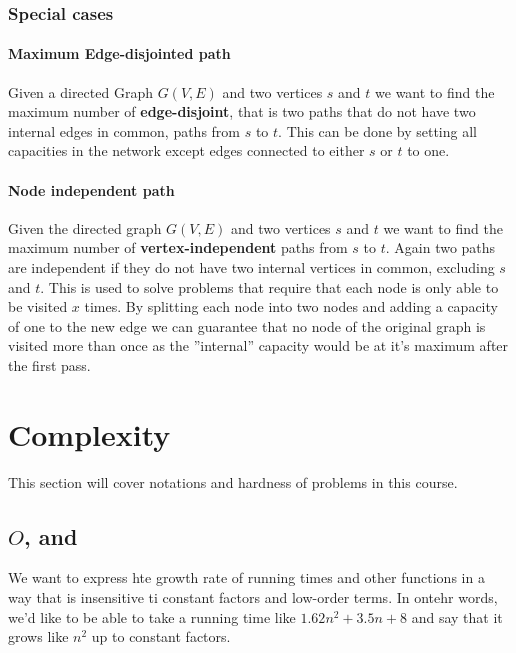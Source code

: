 \documentclass[12pt]{article} %
\begin{document}
\subsubsection{Special cases}

\paragraph{Maximum Edge-disjointed path}
Given a directed Graph $G(V, E)$ and two vertices $s$ and $t$ we want to find the maximum number of \textbf{edge-disjoint}, that is two paths that do not have two internal edges in common, paths from $s$ to $t$. This can be done by setting all capacities in the network except edges connected to either $s$ or $t$ to one.

\paragraph{Node independent path}
Given the directed graph $G(V, E)$ and two vertices $s$ and $t$ we want to find the maximum number of \textbf{vertex-independent} paths from $s$ to $t$. Again two paths are independent if they do not have two internal vertices in common, excluding $s$ and $t$. This is used to solve problems that require that each node is only able to be visited $x$ times. By splitting each node into two nodes and adding a capacity of one to the new edge we can guarantee that no node of the original graph is visited more than once as the ''internal'' capacity would be at it's maximum after the first pass.

\section{Complexity}
This section will cover notations and hardness of problems in this course.

\subsection{$O$, \Omega and \Theta}
We want to express hte growth rate of running times and other functions in a way that is insensitive ti constant factors and low-order terms. In ontehr words, we'd like to be able to take a running time like $1.62n^2 + 3.5n + 8$ and say that it grows like $n^2$ up to constant factors. 
\end{document}
